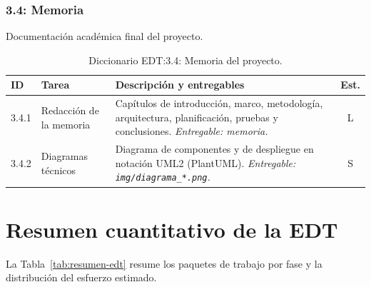 \subsubsection{3.4: Memoria}\label{subsubsec:memoria}

Documentación académica final del proyecto.

\begin{table}[hbtp]
\centering
\small
\begin{tabular}{|l|l|p{7.5cm}|c|}
\hline
\textbf{ID} & \textbf{Tarea} & \textbf{Descripción y entregables} & \textbf{Est.} \\ \hline
3.4.1 & Redacción de la memoria & Capítulos de introducción, marco, metodología, arquitectura, planificación, pruebas y conclusiones. \textit{Entregable: memoria.} & L \\ \hline
3.4.2 & Diagramas técnicos & Diagrama de componentes y de despliegue en notación UML2 (PlantUML). \textit{Entregable: \texttt{img/diagrama\_*.png}.} & S \\ \hline
\end{tabular}
\caption{Diccionario EDT:3.4: Memoria del proyecto.}
\label{tab:dict-3-4}
\end{table}


\section{Resumen cuantitativo de la EDT}\label{sec:resumen-edt}

La Tabla~\ref{tab:resumen-edt} resume los paquetes de trabajo por fase y la distribución del esfuerzo estimado.

